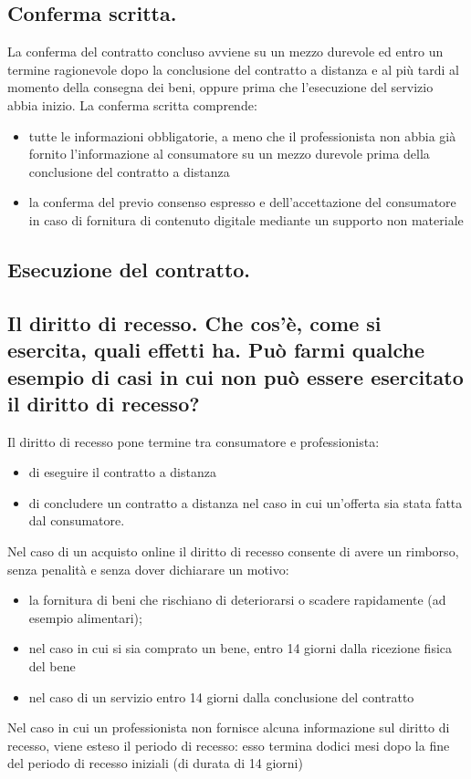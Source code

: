 \subsection{Conferma scritta.}
La conferma del contratto concluso avviene su un mezzo durevole ed entro un termine
ragionevole dopo la conclusione del contratto a distanza e al più tardi al momento della
consegna dei beni, oppure prima che l'esecuzione del servizio abbia inizio.
\newline
La conferma scritta comprende:
\begin{itemize}
    \item tutte le informazioni obbligatorie, a meno che il professionista non abbia già
        fornito l'informazione al consumatore su un mezzo durevole prima della conclusione
        del contratto a distanza
    \item la conferma del previo consenso espresso e dell'accettazione del consumatore in
        caso di fornitura di contenuto digitale mediante un supporto non materiale
\end{itemize}

\subsection{Esecuzione del contratto.}
\subsection{Il diritto di recesso. Che cos'è, come si esercita, quali effetti ha.
Può farmi qualche esempio di casi in cui non può essere esercitato il diritto di recesso?}

Il diritto di recesso pone termine tra consumatore e professionista:
\begin{itemize}
    \item di eseguire il contratto a distanza
    \item di concludere un contratto a distanza nel caso in cui un'offerta sia stata fatta dal consumatore.
\end{itemize}
Nel caso di un acquisto online il diritto di recesso consente di avere un rimborso, senza
penalità e senza dover dichiarare un motivo:
\begin{itemize}
    \item la fornitura di beni che rischiano di deteriorarsi o scadere rapidamente (ad esempio alimentari);
    \item nel caso in cui si sia comprato un bene, entro 14 giorni dalla ricezione fisica del bene
    \item nel caso di un servizio entro 14 giorni dalla conclusione del contratto
\end{itemize}
Nel caso in cui un professionista non fornisce alcuna informazione sul diritto di recesso,
viene esteso il periodo di recesso: esso termina dodici mesi dopo la fine del periodo di
recesso iniziali (di durata di 14 giorni)

